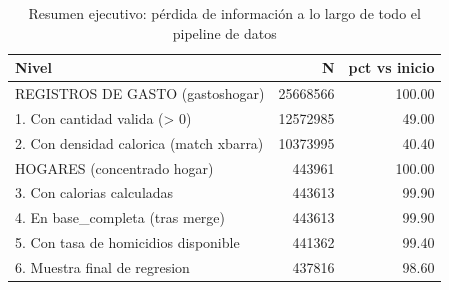 \begin{table}[ht]
\centering
\caption{Resumen ejecutivo: p\'erdida de informaci\'on a lo largo de todo el pipeline de datos} 
\label{tab:00_RESUMEN_EJECUTIVO}
\begin{tabular}{lrr}
  \toprule
Nivel & N & pct vs inicio \\ 
  \midrule
REGISTROS DE GASTO (gastoshogar) & 25668566 & 100.00 \\ 
    1. Con cantidad valida (> 0) & 12572985 & 49.00 \\ 
    2. Con densidad calorica (match xbarra) & 10373995 & 40.40 \\ 
  HOGARES (concentrado hogar) & 443961 & 100.00 \\ 
    3. Con calorias calculadas & 443613 & 99.90 \\ 
    4. En base\_completa (tras merge) & 443613 & 99.90 \\ 
    5. Con tasa de homicidios disponible & 441362 & 99.40 \\ 
    6. Muestra final de regresion & 437816 & 98.60 \\ 
   \bottomrule
\end{tabular}
\end{table}
